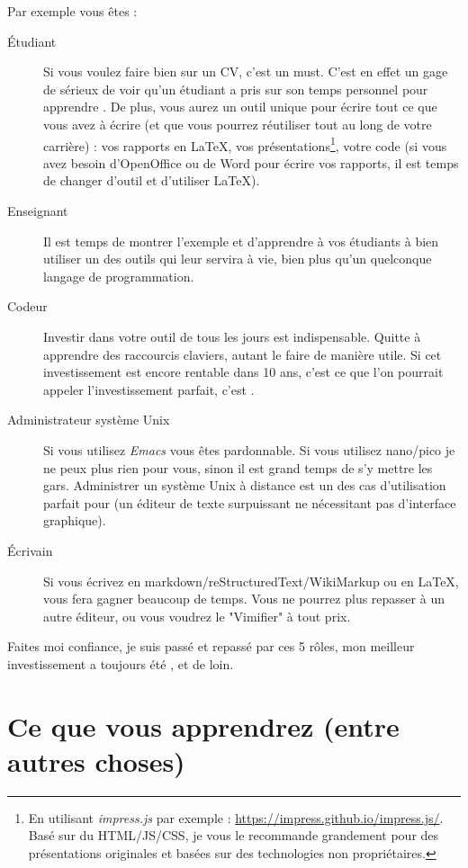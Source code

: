 Par exemple vous êtes :
\begin{description}
    \item[Étudiant] Si vous voulez faire bien sur un CV, c'est un must. C'est en effet un gage de sérieux de voir qu'un étudiant a pris sur son temps personnel pour apprendre \vim. De plus, vous aurez un outil unique pour écrire tout ce que vous avez à écrire (et que vous pourrez réutiliser tout au long de votre carrière) : vos rapports en \LaTeX, vos présentations\footnote{En utilisant \emph{impress.js} par exemple : \url{https://impress.github.io/impress.js/}. Basé sur du HTML/JS/CSS, je vous le recommande grandement pour des présentations originales et basées sur des technologies non propriétaires.}, votre code (si vous avez besoin d'OpenOffice ou de Word pour écrire vos rapports, il est temps de changer d'outil et d'utiliser \LaTeX).
    \item[Enseignant] Il est temps de montrer l'exemple et d'apprendre à vos étudiants à bien utiliser un des outils qui leur servira à vie, bien plus qu'un quelconque langage de programmation.
    \item[Codeur] Investir dans votre outil de tous les jours est indispensable. Quitte à apprendre des raccourcis claviers, autant le faire de manière utile. Si cet investissement est encore rentable dans 10 ans, c'est ce que l'on pourrait appeler l'investissement parfait, c'est \vim.
    \item[Administrateur système Unix] Si vous utilisez \emph{Emacs} vous êtes pardonnable. Si vous utilisez nano/pico je ne peux plus rien pour vous, sinon il est grand temps de s'y mettre les gars. Administrer un système Unix à distance est un des cas d'utilisation parfait pour \vim (un éditeur de texte surpuissant ne nécessitant pas d'interface graphique).
    \item[Écrivain] Si vous écrivez en markdown/reStructuredText/WikiMarkup ou en \LaTeX, \vim vous fera gagner beaucoup de temps. Vous ne pourrez plus repasser à un autre éditeur, ou vous voudrez le "Vimifier" à tout prix.
\end{description}

Faites moi confiance, je suis passé et repassé par ces 5 rôles, mon meilleur investissement a toujours été \vim, et de loin.

\section{Ce que vous apprendrez (entre autres choses)}

